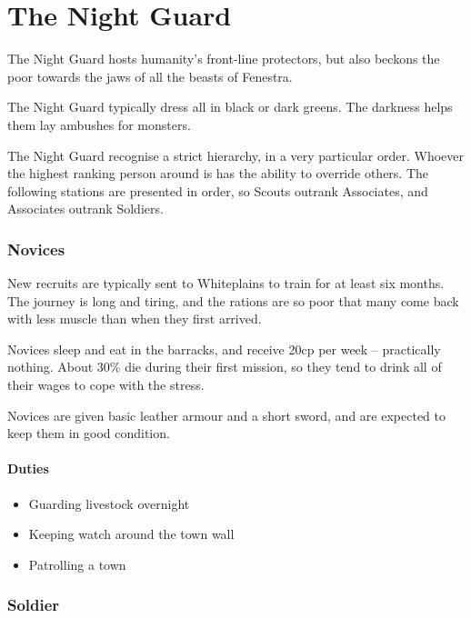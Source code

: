 \chapter{The Night Guard}
\label{nightguard}

\begin{multicols}{2}

\noindent
The Night Guard hosts humanity's front-line protectors, but also beckons the poor towards the jaws of all the beasts of Fenestra.

The Night Guard typically dress all in black or dark greens.
The darkness helps them lay ambushes for monsters.

The Night Guard recognise a strict hierarchy, in a very particular order.
Whoever the highest ranking person around is has the ability to override others.
The following stations are presented in order, so Scouts outrank Associates, and Associates outrank Soldiers.

\subsection{Novices}

New recruits are typically sent to Whiteplains to train for at least six months.
The journey is long and tiring, and the rations are so poor that many come back with less muscle than when they first arrived.

Novices sleep and eat in the barracks, and receive 20cp per week -- practically nothing.
About 30\% die during their first mission, so they tend to drink all of their wages to cope with the stress.

Novices are given basic leather armour and a short sword, and are expected to keep them in good condition.

\subsubsection{Duties}

\begin{itemize}

	\item{Guarding livestock overnight}
	\item{Keeping watch around the town wall}
	\item{Patrolling a town}
\end{itemize}

\subsection{Soldier}


\end{multicols}
